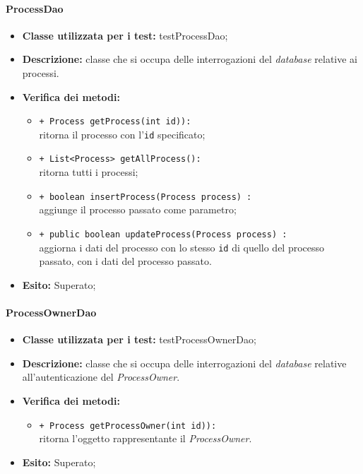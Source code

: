\paragraph{ProcessDao}
\begin{flushleft}
\begin{itemize}
\item \textbf{Classe utilizzata per i test:} testProcessDao;
\item \textbf{Descrizione:} classe che si occupa delle interrogazioni del \textit{database} relative ai processi.
\item \textbf{Verifica dei metodi:}
\begin{sloppypar}
\begin{itemize}
\item \texttt{+ Process getProcess(int id)):}\\ ritorna il processo con l'\texttt{id} specificato; 
\item \texttt{+ List<Process> getAllProcess():}\\ ritorna tutti i processi;
\item \texttt{+ boolean insertProcess(Process process) :}\\ aggiunge il processo passato come parametro;
\item \texttt{+ public boolean updateProcess(Process process) :}\\ aggiorna i dati del processo con lo stesso \texttt{id} di quello del processo passato, con i dati del processo passato.
\end{itemize}
\end{sloppypar}
\item \textbf{Esito:} Superato;
\end{itemize}
\end{flushleft}

\paragraph{ProcessOwnerDao}
\begin{flushleft}
\begin{itemize}
\item \textbf{Classe utilizzata per i test:} testProcessOwnerDao;
\item \textbf{Descrizione:} classe che si occupa delle interrogazioni del \textit{database} relative all'autenticazione del \textit{ProcessOwner}.
\item \textbf{Verifica dei metodi:}
\begin{sloppypar}
\begin{itemize}
\item \texttt{+ Process getProcessOwner(int id)):}\\ ritorna l'oggetto rappresentante il \textit{ProcessOwner}. 
\end{itemize}
\end{sloppypar}
\item \textbf{Esito:} Superato;
\end{itemize}
\end{flushleft}

